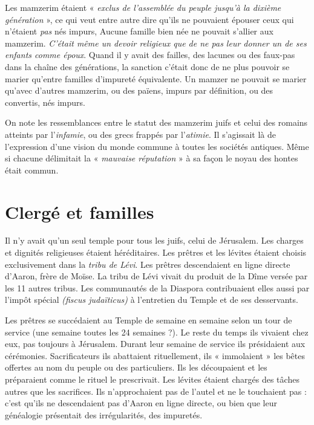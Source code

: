  Les mamzerim étaient « \emph{exclus de l'assemblée du peuple jusqu'à la dixième génération} », ce qui veut entre autre dire qu'ils ne pouvaient épouser ceux qui n'étaient \emph{pas} nés impurs, Aucune famille bien née ne pouvait s'allier aux mamzerim. \emph{C'était même un devoir religieux que de ne pas leur donner un de ses enfants comme époux}. Quand il y avait des failles, des lacunes ou des faux-pas dans la chaîne des générations, la sanction c'était donc de ne plus pouvoir se marier qu'entre familles d'impureté équivalente. Un mamzer ne pouvait se marier qu'avec d'autres mamzerim, ou des païens, impurs par définition, ou des convertis, nés impurs. 

 On note les ressemblances entre le statut des mamzerim juifs et celui des romains atteints par l'\emph{infamie}, ou des grecs frappés par l'\emph{atimie}. Il s'agissait là de l'expression d'une vision du monde commune à toutes les sociétés antiques. Même si chacune délimitait la « \emph{mauvaise réputation} » à sa façon le noyau des hontes était commun. 

\section{Clergé et familles}

 Il n'y avait qu'un seul temple pour tous les juifs, celui de Jérusalem. Les charges et dignités religieuses étaient héréditaires. Les prêtres et les lévites étaient choisis exclusivement dans la \emph{tribu de Lévi}. Les prêtres descendaient en ligne directe d'Aaron, frère de Moïse. La tribu de Lévi vivait du produit de la Dîme versée par les 11 autres tribus. Les communautés de la Diaspora contribuaient elles aussi par l'impôt spécial \emph{(fiscus judaïticus)} à l'entretien du Temple et de ses desservants. 

 Les prêtres se succédaient au Temple de semaine en semaine selon un tour de service (une semaine toutes les 24 semaines ?). Le reste du temps ils vivaient chez eux, pas toujours à Jérusalem. Durant leur semaine de service ils présidaient aux cérémonies. Sacrificateurs ils abattaient rituellement, ils « immolaient » les bêtes offertes au nom du peuple ou des particuliers. Ils les découpaient et les préparaient comme le rituel le prescrivait. Les lévites étaient chargés des tâches autres que les sacrifices. Ils n'approchaient pas de l'autel et ne le touchaient pas : c'est qu'ils ne descendaient pas d'Aaron en ligne directe, ou bien que leur généalogie présentait des irrégularités, des impuretés.

